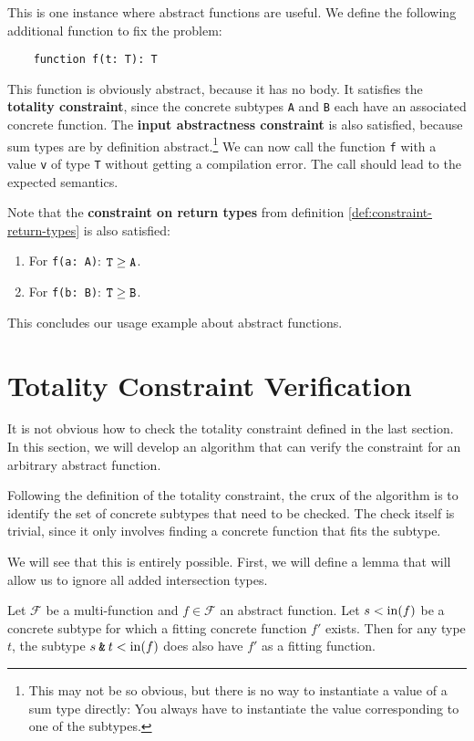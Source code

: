 This is one instance where abstract functions are useful. We define the following additional function to fix the problem:
\begin{lstlisting}
    function f(t: T): T
\end{lstlisting}

\noindent This function is obviously abstract, because it has no body. It satisfies the \textbf{totality constraint}, since the concrete subtypes \texttt{A} and \texttt{B} each have an associated concrete function. The \textbf{input abstractness constraint} is also satisfied, because sum types are by definition abstract.\footnote{This may not be so obvious, but there is no way to instantiate a value of a sum type directly: You always have to instantiate the value corresponding to one of the subtypes.} We can now call the function \texttt{f} with a value \texttt{v} of type \texttt{T} without getting a compilation error. The call should lead to the expected semantics. 

Note that the \textbf{constraint on return types} from definition \ref{def:constraint-return-types} is also satisfied:
\begin{enumerate}
	\item For \texttt{f(a: A)}: $\texttt{T} \geq \texttt{A}$.
	\item For \texttt{f(b: B)}: $\texttt{T} \geq \texttt{B}$.
\end{enumerate}

\noindent This concludes our usage example about abstract functions.



\section{Totality Constraint Verification}

It is not obvious how to check the totality constraint defined in the last section. In this section, we will develop an algorithm that can verify the constraint for an arbitrary abstract function.

Following the definition of the totality constraint, the crux of the algorithm is to identify the set of concrete subtypes that need to be checked. The check itself is trivial, since it only involves finding a concrete function that fits the subtype.

We will see that this is entirely possible. First, we will define a lemma that will allow us to ignore all added intersection types.

\begin{lemma} \label{lemma:totality-constraint-intersection-fit}
	Let $\mathcal{F}$ be a multi-function and $f \in \mathcal{F}$ an abstract function. Let $s < \operatorname{in}(f)$ be a concrete subtype for which a fitting concrete function $f'$ exists. Then for any type $t$, the subtype $s \mathbin{\texttt{\&}} t < \operatorname{in}(f)$ does also have $f'$ as a fitting function.
\end{lemma}

